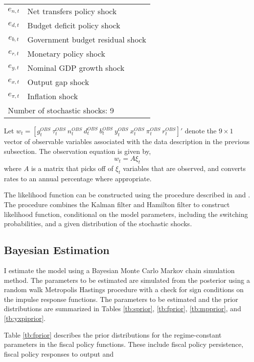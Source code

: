 \documentclass[11pt]{article}
\newcommand{\beq}{\begin{equation}}
\newcommand{\eeq}{\end{equation}}
\newcommand{\citee}[1]{\citet{#1}}
\begin{document}
\begin{table}
\begin{center}
\begin{tabular}{cl}
    $e_{n,t}$ & Net transfers policy shock \\ 
    $e_{d,t}$ & Budget deficit policy shock \\
    $e_{b,t}$ & Government budget residual shock \\
    $e_{r,t}$ & Monetary policy shock \\
    $e_{y,t}$ & Nominal GDP growth shock \\
    $e_{x,t}$ & Output gap shock \\
    $e_{\pi,t}$ & Inflation shock \\ \hline
    \multicolumn{2}{l}{Number of stochastic shocks: 9} \\    
  \end{tabular}\end{center}
\end{table}

Let $w_t = [g_t^{OBS}~ \tau_t^{OBS}~ n_t^{OBS}~ d_t^{OBS}~ b_t^{OBS}~ y_t^{OBS}~ x_t^{OBS}~ \pi_t^{OBS}~ r_t^{OBS}]'$ denote the $9 \times 1$ vector of observable variables associated with the data description in the previous subsection.  The observation equation is given by,
\beq \label{eq:obs} w_t = A \xi_t \eeq
where $A$ is a matrix that picks off of $\xi_t$ variables that are observed, and converts rates to an annual percentage where appropriate. 

The likelihood function can be constructed using the procedure described in \citee{kim1994} and \citee{kimnelson}.  The procedure combines the Kalman filter and Hamilton filter to construct likelihood function, conditional on the model parameters, including the switching probabilities, and a given distribution of the stochastic shocks.

\subsection{Bayesian Estimation}

I estimate the model using a Bayesian Monte Carlo Markov chain simulation method.  The parameters to be estimated are simulated from the posterior using a random walk Metropolis Hastings procedure with a check for sign conditions on the impulse response functions.  The parameters to be estimated and the prior distributions are summarized in Tables \ref{tb:sprior}, \ref{tb:fprior}, \ref{tb:mpprior}, and \ref{tb:yxpiprior}.

Table \ref{tb:fprior} describes the prior distributions for the regime-constant parameters in the fiscal policy functions.  These include fiscal policy persistence, fiscal policy responses to output and 
\end{document}
